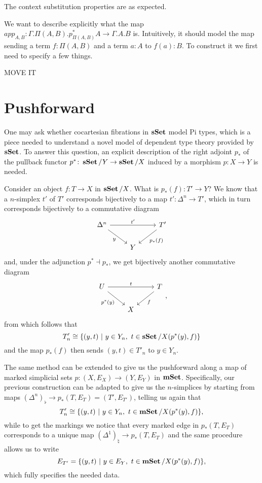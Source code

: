 \documentclass[a4paper,fontsize=12pt]{scrartcl}
\begin{document}
The context substitution properties are as expected.

We want to describe explicitly what the map
$app_{A,B}\colon\Gamma.\Pi(A,B).p^*_{\Pi(A,B)}A\rightarrow\Gamma.A.B$ is.
Intuitively, it should model the map sending a term $f:\Pi(A,B)$ and a term
$a:A$ to $f(a):B$. To construct it we first need to specify a few things.

MOVE IT




\section{Pushforward}

One may ask whether cocartesian fibrations in $\operatorname{\mathbf{sSet}}$ model Pi types, which is a
piece needed to understand a novel model of dependent type theory provided by
$\operatorname{\mathbf{sSet}}$. To answer this question, an explicit description of the right adjoint
$p_*$ of the pullback functor $p^*\colon\operatorname{\mathbf{sSet}}/Y\rightarrow\operatorname{\mathbf{sSet}}/X$ induced by a
morphism $p\colon X\rightarrow Y$ is needed.

Consider an object $f\colon T\rightarrow X$ in $\operatorname{\mathbf{sSet}}/X$. What is $p_*(f)\colon
T'\rightarrow Y$? We know that a $n$-simplex $t'$ of $T'$ corresponds
bijectively to a map $t'\colon\Delta^n\rightarrow T'$, which in turn corresponds
bijectively to a commutative diagram
\[\begin{tikzcd}
	{\Delta^n} & {} & {T'} \\
	& Y
	\arrow["{t'}", from=1-1, to=1-3]
	\arrow["y"', from=1-1, to=2-2]
	\arrow["{p_*(f)}", from=1-3, to=2-2]
\end{tikzcd}\]
and, under the adjunction $p^*\dashv p_*$, we get bijectively another
commutative diagram
\[\begin{tikzcd}
	U & {} & T \\
	& X
	\arrow["t", from=1-1, to=1-3]
	\arrow["{p^*(y)}"', from=1-1, to=2-2]
	\arrow["f", from=1-3, to=2-2]
\end{tikzcd},\]
from which follows that
\[T'_n\cong\{(y,t)\ |\ y\in Y_n,\ t\in\sSet/X(p^*(y),f)\}\]
and the map $p_*(f)$ then sends $(y,t)\in T'_n$ to $y\in Y_n$.

The same method can be extended to give us the pushforward along a map of marked
simplicial sets $p\colon (X,E_X)\rightarrow (Y,E_Y)$ in $\operatorname{\mathbf{mSet}}$. Specifically,
our previous construction can be adapted to give us the $n$-simplices by
starting from maps $(\Delta^n)_\flat\rightarrow p_*(T,E_T)=(T',E_{T'})$, telling
us again that
\[T'_n\cong\{(y,t)\ |\ y\in Y_n,\ t\in\mSet/X(p^*(y),f)\},\]
while to get the markings we notice that every marked edge in $p_*(T,E_T)$
corresponds to a unique map $(\Delta^1)_\natural\rightarrow p_*(T,E_T)$ and the
same procedure allows us to write
\[E_{T'}=\{(y,t)\ |\ y\in E_Y,\ t\in\mSet/X(p^*(y),f)\},\]
which fully specifies the needed data.
\end{document}
